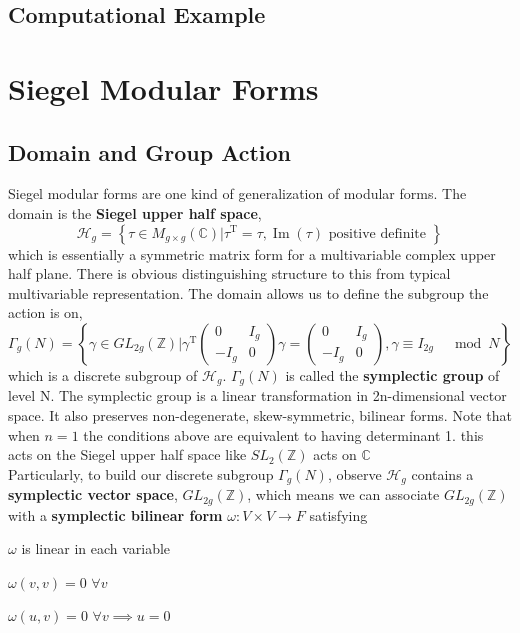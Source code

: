 \documentclass[11pt, oneside]{amsart}
\begin{document}
\subsection{Computational Example}

\section{Siegel Modular Forms}
\subsection{Domain and Group Action}
Siegel modular forms are one kind of generalization of modular forms. The domain is the \textbf{Siegel upper half space}, $$\mathcal{H}_{g}=\left\{\tau \in M_{g \times g}(\mathbb{C}) | \tau^{\mathrm{T}}=\tau, \operatorname{Im}(\tau) \text { positive definite }\right\}$$ which is essentially a symmetric matrix form for a multivariable complex upper half plane. There is obvious distinguishing structure to this from typical multivariable representation. The domain allows us to define the subgroup the action is on, $$\Gamma_{g}(N)=\left\{\gamma \in G L_{2 g}(\mathbb{Z}) | \gamma^{\mathrm{T}} \left( \begin{array}{cc}{0} & {I_{g}} \\ {-I_{g}} & {0}\end{array}\right) \gamma=\left( \begin{array}{cc}{0} & {I_{g}} \\ {-I_{g}} & {0}\end{array}\right), \gamma \equiv I_{2 g} \quad \bmod N\right\}$$ which is a discrete subgroup of $\mathcal{H}_{g}$. $\Gamma_{g}(N)$ is called the \textbf{symplectic group} of level N. The symplectic group is a linear transformation in 2n-dimensional vector space. It also preserves non-degenerate, skew-symmetric, bilinear forms. Note that when $n=1$ the conditions above are equivalent to having determinant 1. this acts on the Siegel upper half space like $SL_{2}(\mathbb{Z})$ acts on $\mathbb{C}$\\
Particularly, to build our discrete subgroup $\Gamma_{g}(N)$, observe $\mathcal{H}_{g}$ contains a \textbf{symplectic vector space}, $G L_{2 g}(\mathbb{Z})$, which means we can associate $G L_{2 g}(\mathbb{Z})$ with a \textbf{symplectic bilinear form} $\omega:V\times V\rightarrow F$ satisfying
\begin{list}{•}{•}
\item $\omega$ is linear in each variable
\item $\omega(v,v)=0$ $\forall v$
\item $\omega(u,v)=0$ $\forall v\implies u=0$
\end{list}
\end{document}

